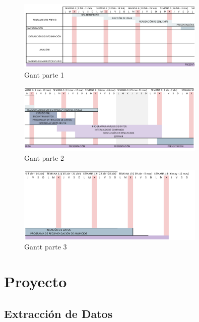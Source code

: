 \documentclass[
  letterpaper,
  DIV=11,
  numbers=noendperiod]{scrartcl}
\begin{document}
\begin{figure}[htbp]
    \centering
    \includegraphics[width=0.8\textwidth, height=0.4\textheight]{gant1.png}
    \caption{Gant parte 1}
    \label{fig:gant1}
\end{figure}

\begin{figure}[htbp]
    \centering
    \includegraphics[width=0.8\textwidth, height=0.4\textheight]{gant2.png}
    \caption{Gant parte 2}
    \label{fig:gant2}
\end{figure}

\begin{figure}[htbp]
    \centering
    \includegraphics[width=0.8\textwidth, height=0.4\textheight]{gant3.png}
    \caption{Gantt parte 3}
    \label{fig:gantt3}
\end{figure}

\newpage{}

\section{Proyecto}\label{proyecto}

\subsection{Extracción de Datos}\label{extracciuxf3n-de-datos-1}
\end{document}
